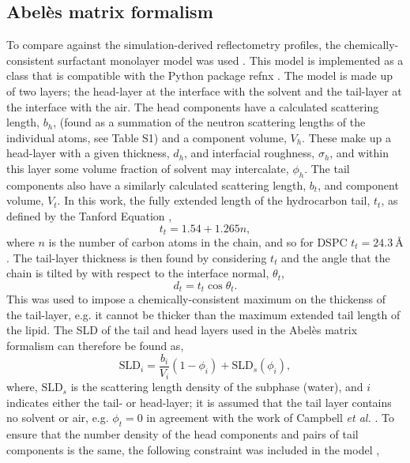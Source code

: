 \documentclass[amsmath,amssymb,twocolumn,superscriptaddress,aps,prl]{revtex4-1}
\begin{document}
\subsection{Abel\`{e}s matrix formalism}
To compare against the simulation-derived reflectometry profiles, the chemically-consistent surfactant monolayer model was used \cite{McCluskey2018,McCluskey2018a}.
This model is implemented as a class that is compatible with the Python package refnx \cite{Nelson2018,refnx}.
The model is made up of two layers; the head-layer at the interface with the solvent and the tail-layer at the interface with the air.
The head components have a calculated scattering length, $b_h$, (found as a summation of the neutron scattering lengths of the individual atoms, see Table S1) and a component volume, $V_h$.
These make up a head-layer with a given thickness, $d_h$, and interfacial roughness, $\sigma_h$, and within this layer some volume fraction of solvent may intercalate, $\phi_h$.
The tail components also have a similarly calculated scattering length, $b_t$, and component volume, $V_t$.
In this work, the fully extended length of the hydrocarbon tail, $t_t$, as defined by the Tanford Equation \cite{Tanford1980},
%
\begin{equation}
  t_t = 1.54 + 1.265n,
\end{equation}
%
where $n$ is the number of carbon atoms in the chain, and so for DSPC $t_t = \SI{24.3}{\angstrom}$.
The tail-layer thickness is then found by considering $t_t$ and the angle that the chain is tilted by with respect to the interface normal, $\theta_t$,
%
\begin{equation}
  d_t = t_t\cos{\theta_t}.
\end{equation}
%
This was used to impose a chemically-consistent maximum on the thickenss of the tail-layer, e.g. it cannot be thicker than the maximum extended tail length of the lipid.
The SLD of the tail and head layers used in the Abel\`{e}s matrix formalism can therefore be found as,
%
\begin{equation}
  \text{SLD}_i = \frac{b_i}{V_i}(1 - \phi_i) + \text{SLD}_s(\phi_i),
\end{equation}
%
where, $\text{SLD}_s$ is the scattering length density of the subphase (water), and $i$ indicates either the tail- or head-layer; it is assumed that the tail layer contains no solvent or air, e.g. $\phi_t = 0$ in agreement with the work of Campbell \emph{et al.} \cite{Campbell2018}.
To ensure that the number density of the head components and pairs of tail components is the same, the following constraint was included in the model \cite{Braun2017},
\end{document}
